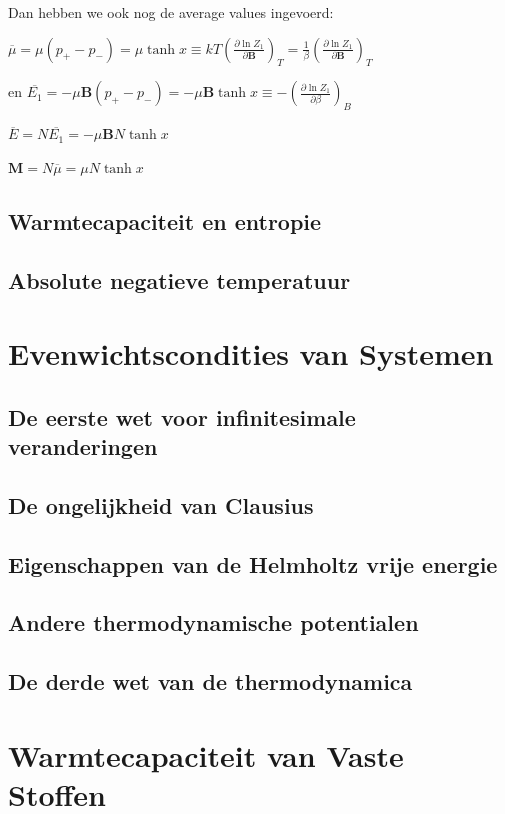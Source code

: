 \documentclass[a4paper,twoside]{article}
\theoremstyle{definition}
\theoremstyle{plain}
\begin{document}
Dan hebben we ook nog de average values ingevoerd:

\(\overline{\mu} = \mu (p_+ - p_-)= \mu \tanh x \equiv  kT \left(\frac{\partial \ln Z_1}{\partial \bm B}\right)_T = \frac{1}{\beta} \left(\frac{\partial \ln Z_1}{\partial \bm B}\right)_T\)

en
\(\overline{E_1} = -\mu \bm B (p_+ - p_-) = -\mu \bm B \tanh x \equiv -\left(\frac{\partial \ln Z_1}{\partial \beta}\right)_B\)

\(\overline{E} = N \overline{E_1} = -\mu \bm B N \tanh x \)

\(\bm M = N \overline{\mu} = \mu N \tanh x \)

\subsection{Warmtecapaciteit en entropie}

\subsection{Absolute negatieve temperatuur}

\section{Evenwichtscondities van Systemen}
\subsection{De eerste wet voor infinitesimale veranderingen}
\subsection{De ongelijkheid van Clausius}
\subsection{Eigenschappen van de Helmholtz vrije energie}
\subsection{Andere thermodynamische potentialen}
\subsection{De derde wet van de thermodynamica}

\section{Warmtecapaciteit van Vaste Stoffen}
\end{document}

